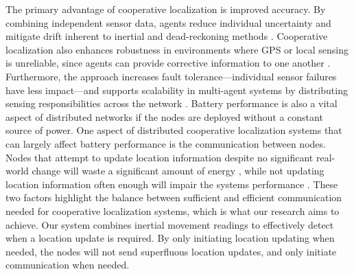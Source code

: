 \noindent The primary advantage of cooperative localization is improved accuracy. By combining independent sensor data, agents reduce individual uncertainty and mitigate drift inherent to inertial and dead-reckoning methods \cite{CooperativeLocalizationApproachforMulti-RobotSystemsBasedonStateEstimationErrorCompensation}. Cooperative localization also enhances robustness in environments where GPS or local sensing is unreliable, since agents can provide corrective information to one another \cite{CooperativeLocalizationUsingDistanceMeasurementsforMobileNodes}. Furthermore, the approach increases fault tolerance—individual sensor failures have less impact—and supports scalability in multi-agent systems by distributing sensing responsibilities across the network \cite{Fault-TolerantMulti-ModalLocalizationofMulti-RobotsonMatrixLieGroups}. Battery performance is also a vital aspect of distributed networks if the nodes are deployed without a constant source of power. One aspect of distributed cooperative localization systems that can largely affect battery performance is the communication between nodes. Nodes that attempt to update location information despite no significant real-world change will waste a significant amount of energy \cite{EnergyEfficiencyOptimizationofCooperativeCommunicationinWirelessSensorNetworks}, while not updating location information often enough will impair the systems performance \cite{Space-TimeHierarchicalGraphBasedCooperativeLocalizationinWirelessSensorNetworks}. These two factors highlight the balance between sufficient and efficient communication needed for cooperative localization systems, which is what our research aims to achieve. Our system combines inertial movement readings to effectively detect when a location update is required. By only initiating location updating when needed, the nodes will not send superfluous location updates, and only initiate communication when needed.

